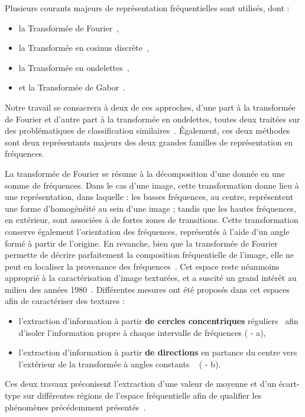 Plusieurs courants majeurs de représentation fréquentielles sont utilisés, dont : 
\begin{itemize}
    \item la Transformée de Fourier~\cite{Ursani2007, Smach2008a},
    \item la Transformée en cosinus discrète~\cite{Sorwar2001},
    \item la Transformée en ondelettes~\cite{Arivazhagan2003,Hong2010},
    \item et la Transformée de Gabor~\cite{Ursani2007}.
\end{itemize}
Notre travail se consacrera à deux de ces approches, d'une part à la transformée de Fourier et d'autre part à la transformée en ondelettes, toutes deux traitées sur des problématiques de classification similaires~\cite{Wiltgen2008,Halimi2017a,Halimi2017b}. Également, ces deux méthodes sont deux représentants majeurs des deux grandes familles de représentation en fréquences.\par

La transformée de Fourier se résume à la décomposition d'une donnée en une somme de fréquences. Dans le cas d'une image, cette transformation donne lieu à une représentation, dans laquelle : les basses fréquences, au centre, représentent une forme d'homogénéité au sein d'une image ; tandis que les hautes fréquences, en extérieur, sont associées à de fortes zones de transitions. Cette transformation conserve également l'orientation des fréquences, représentés à l'aide d'un angle formé à partir de l'origine. En revanche, bien que la transformée de Fourier permette de décrire parfaitement la composition fréquentielle de l'image, elle ne peut en localiser la provenance des fréquences~\cite{Wiltgen2008}. Cet espace reste néanmoins approprié à la caractérisation d'image texturées, et a suscité un grand intérêt au milieu des années 1980~\cite{Persoon1986}. Différentes mesures ont été proposés dans cet espaces afin de caractériser des textures :
\begin{itemize}
    \item l'extraction d'information à partir \textbf{de cercles concentriques} réguliers~\cite{Smach2008a, Wiltgen2008} afin d'isoler l'information propre à chaque intervalle de fréquences ( - a),
    \item l'extraction d'information à partir \textbf{de directions} en partance du centre vers l'extérieur de la transformée à angles constants ~\cite{Wiltgen2008} ( - b).
\end{itemize}
Ces deux travaux préconisent l'extraction d'une valeur de moyenne et d'un écart-type sur différentes régions de l'espace fréquentielle afin de qualifier les phénomènes précédemment présentés~\cite{Smach2008a, Wiltgen2008}. 

